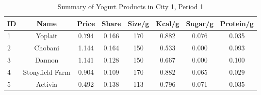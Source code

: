 \begin{table}[htbp]
\centering
\begin{tabular}{lccccccc}
\toprule
ID & Name & Price & Share & Size/g & Kcal/g & Sugar/g & Protein/g \\
\midrule
1 & Yoplait & 0.794 & 0.166 & 170 & 0.882 & 0.076 & 0.035 \\
2 & Chobani & 1.144 & 0.164 & 150 & 0.533 & 0.000 & 0.093 \\
3 & Dannon & 1.141 & 0.128 & 150 & 0.667 & 0.000 & 0.100 \\
4 & Stonyfield Farm & 0.904 & 0.109 & 170 & 0.882 & 0.065 & 0.029 \\
5 & Activia & 0.492 & 0.138 & 113 & 0.796 & 0.071 & 0.035 \\
\bottomrule
\end{tabular}

\caption{Summary of Yogurt Products in City 1, Period 1}
\label{tab:yoghurt_summary}
\end{table}
